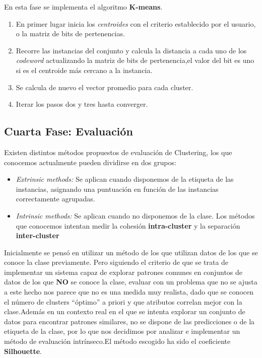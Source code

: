 \documentclass[10pt,a4paper]{article}
\begin{document}
En esta fase se implementa el algoritmo \textbf{K-means}.
\begin{enumerate}
	\item En primer lugar inicia los \textit{centroides} con el criterio establecido por el usuario, o la matriz de bits de pertenencias.
	\item Recorre las instancias del conjunto y calcula la distancia a cada uno de los \textit{codeword} actualizando la matriz de bits de pertenencia,el valor 		del bit es uno si es el centroide más cercano a la instancia.
	\item Se calcula de nuevo el vector promedio para cada cluster.
	\item Iterar los pasos dos y tres hasta converger.
\end{enumerate}

\subsection*{Cuarta Fase: Evaluación}

Existen distintos métodos propuestos de evaluación de Clustering, los que conocemos actualmente pueden dividirse en dos grupos:
\begin{itemize}
	\item \emph{Extrinsic methods: } Se aplican cuando disponemos de la etiqueta de las instancias, asignando una puntuación en función de las instancias correctamente agrupadas.
	
	\item \emph{Intrinsic methods: } Se aplican cuando no disponemos de la clase. Los métodos que conocemos intentan medir la cohesión \textbf{intra-cluster} y la separación \textbf{inter-cluster}
\end{itemize}

Inicialmente se pensó en utilizar un método de los que utilizan datos de los que se conoce la clase previamente. Pero siguiendo el criterio de que se trata de implementar un sistema capaz de explorar patrones comunes en conjuntos de datos de los que \textbf{NO} se conoce la clase, evaluar con un problema que no se ajusta a este hecho nos parece que no es una medida muy realista, dado que se conocen el número de clusters ``óptimo'' a priori y que atributos correlan mejor con la clase.Además en un contexto real en el que se intenta explorar un conjunto de datos para encontrar patrones similares, no se dispone de las predicciones o de la etiqueta de la clase, por lo que nos decidimos por analizar e implementar un método de evaluación intrínseco.El método escogido ha sido el coeficiente \textbf{Silhouette}.
\end{document}
